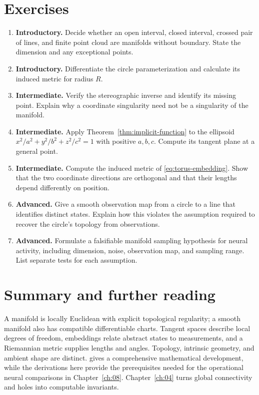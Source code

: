 \section{Exercises}
\begin{enumerate}
\item \textbf{Introductory.} Decide whether an open interval, closed interval, crossed pair of lines, and finite point cloud are manifolds without boundary. State the dimension and any exceptional points.
\item \textbf{Introductory.} Differentiate the circle parameterization and calculate its induced metric for radius $R$.
\item \textbf{Intermediate.} Verify the stereographic inverse and identify its missing point. Explain why a coordinate singularity need not be a singularity of the manifold.
\item \textbf{Intermediate.} Apply Theorem~\ref{thm:implicit-function} to the ellipsoid $x^2/a^2+y^2/b^2+z^2/c^2=1$ with positive $a,b,c$. Compute its tangent plane at a general point.
\item \textbf{Intermediate.} Compute the induced metric of \eqref{eq:torus-embedding}. Show that the two coordinate directions are orthogonal and that their lengths depend differently on position.
\item \textbf{Advanced.} Give a smooth observation map from a circle to a line that identifies distinct states. Explain how this violates the assumption required to recover the circle's topology from observations.
\item \textbf{Advanced.} Formulate a falsifiable manifold sampling hypothesis for neural activity, including dimension, noise, observation map, and sampling range. List separate tests for each assumption.
\end{enumerate}

\section{Summary and further reading}
A manifold is locally Euclidean with explicit topological regularity; a smooth manifold also has compatible differentiable charts. Tangent spaces describe local degrees of freedom, embeddings relate abstract states to measurements, and a Riemannian metric supplies lengths and angles. Topology, intrinsic geometry, and ambient shape are distinct. \citet{lee2012} gives a comprehensive mathematical development, while the derivations here provide the prerequisites needed for the operational neural comparisons in Chapter~\ref{ch:08}. Chapter~\ref{ch:04} turns global connectivity and holes into computable invariants.
